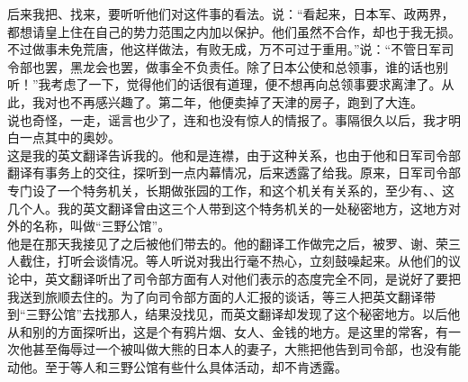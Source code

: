 后来我把、找来，要听听他们对这件事的看法。说：“看起来，日本军、政两界，都想请皇上住在自己的势力范围之内加以保护。他们虽然不合作，却也于我无损。不过做事未免荒唐，他这样做法，有败无成，万不可过于重用。”说：“不管日军司令部也罢，黑龙会也罢，做事全不负责任。除了日本公使和总领事，谁的话也别听！”我考虑了一下，觉得他们的话很有道理，便不想再向总领事要求离津了。从此，我对也不再感兴趣了。第二年，他便卖掉了天津的房子，跑到了大连。\\

说也奇怪，一走，谣言也少了，连和也没有惊人的情报了。事隔很久以后，我才明白一点其中的奥妙。\\

这是我的英文翻译告诉我的。他和是连襟，由于这种关系，也由于他和日军司令部翻译有事务上的交往，探听到一点内幕情况，后来透露了给我。原来，日军司令部专门设了一个特务机关，长期做张园的工作，和这个机关有关系的，至少有、、这几个人。我的英文翻译曾由这三个人带到这个特务机关的一处秘密地方，这地方对外的名称，叫做“三野公馆”。\\

他是在那天我接见了之后被他们带去的。他的翻译工作做完之后，被罗、谢、荣三人截住，打听会谈情况。等人听说对我出行毫不热心，立刻鼓噪起来。从他们的议论中，英文翻译听出了司令部方面有人对他们表示的态度完全不同，是说好了要把我送到旅顺去住的。为了向司令部方面的人汇报的谈话，等三人把英文翻译带到“三野公馆”去找那人，结果没找见，而英文翻译却发现了这个秘密地方。以后他从和别的方面探听出，这是个有鸦片烟、女人、金钱的地方。是这里的常客，有一次他甚至侮辱过一个被叫做大熊的日本人的妻子，大熊把他告到司令部，也没有能动他。至于等人和三野公馆有些什么具体活动，却不肯透露。\\

